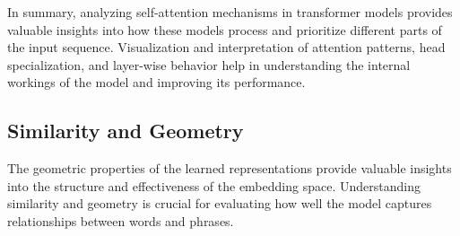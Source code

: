 In summary, analyzing self-attention mechanisms in transformer models provides valuable insights into how these models process and prioritize different parts of the input sequence. Visualization and interpretation of attention patterns, head specialization, and layer-wise behavior help in understanding the internal workings of the model and improving its performance.


\subsection{Similarity and Geometry}

The geometric properties of the learned representations provide valuable insights into the structure and effectiveness of the embedding space. Understanding similarity and geometry is crucial for evaluating how well the model captures relationships between words and phrases.


